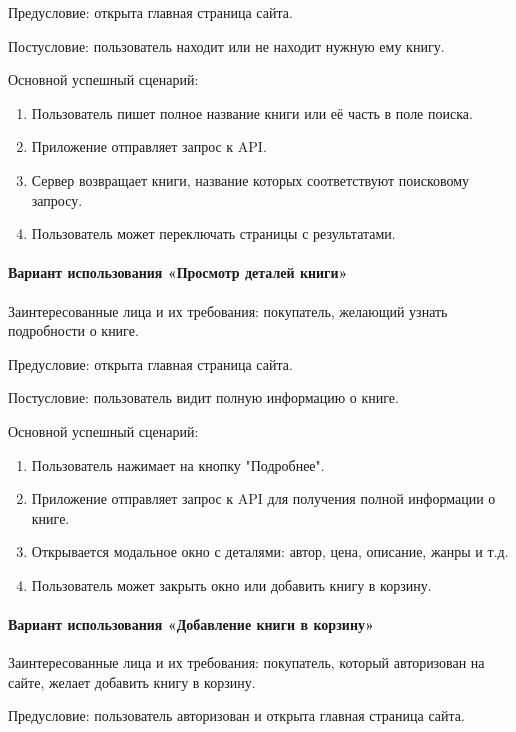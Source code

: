 Предусловие: открыта главная страница сайта.

Постусловие: пользователь находит или не находит нужную ему книгу.

Основной успешный сценарий:

\begin{enumerate}
	\item Пользователь пишет полное название книги или её часть в поле поиска.
	\item Приложение отправляет запрос к API. 
	\item Сервер возвращает книги, название которых соответствуют поисковому запросу.
	\item Пользователь может переключать страницы с результатами.
\end{enumerate}


\paragraph{Вариант использования «Просмотр деталей книги» }

Заинтересованные лица и их требования: покупатель, желающий узнать подробности о книге.

Предусловие: открыта главная страница сайта.

Постусловие: пользователь видит полную информацию о книге.

Основной успешный сценарий:

\begin{enumerate}
	\item Пользователь нажимает на кнопку "Подробнее".
	\item Приложение отправляет запрос к API для получения полной информации о книге.
	\item Открывается модальное окно с деталями: автор, цена, описание, жанры и т.д.
	\item Пользователь может закрыть окно или добавить книгу в корзину.
\end{enumerate}


\paragraph{Вариант использования «Добавление книги в корзину»}

Заинтересованные лица и их требования: покупатель, который авторизован на сайте, желает добавить книгу в корзину.

Предусловие: пользователь авторизован и открыта главная страница сайта.

